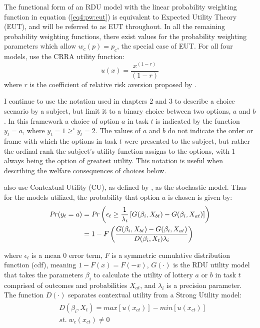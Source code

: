 \documentclass[../main.tex]{subfiles}
\begin{document}
The functional form of an RDU model with the linear probability weighting function in equation (\ref{eq4:pw:eut}) is equivalent to Expected Utility Theory (EUT), and will be referred to as EUT throughout.
In all the remaining probability weighting functions, there exist values for the probability weighting parameters which allow $w_c(p) = p_c$, the special case of EUT.
For all four models, \textcite{Harrison2016} use the CRRA utility function:
\begin{equation}
	\label{eq4:CRRA}
	u(x) = \frac{x^{(1-r)}}{(1-r)}
\end{equation}
\noindent where $r$ is the coefficient of relative risk aversion proposed by \textcite{Pratt1964}.

I continue to use the notation used in chapters 2 and 3 to describe a choice scenario by a subject, but limit it to a binary choice between two options, $a$ and $b$.
In this framework a choice of option $a$ in task $t$ is indicated by the function $y_t = a$, where $y_t = 1 \geq^i y_t = 2$.
The values of $a$ and $b$ do not indicate the order or frame with which the options in task $t$ were presented to the subject, but rather the ordinal rank the subject's utility function assigns to the options, with 1 always being the option of greatest utility.
This notation is useful when describing the welfare consequences of choices below.

\textcite{Harrison2016} also use Contextual Utility (CU), as defined by \textcite{Wilcox2008}, as the stochastic model.
Thus for the models utilized, the probability that option $a$ is chosen is given by:
\begin{align}
	\label{eq4:RE.2}
	\begin{split}
		{\ensuremath{\mathit{Pr}}}(y_t = a) &= {\mathit{Pr}}\left(  \epsilon_t \geq \frac{1}{\lambda_i} \left[ G(\beta_i,X_{bt}) - G(\beta_i,X_{at}) \right] \right)\\
		&= 1 - F\left( \dfrac{G(\beta_i,X_{bt}) - G(\beta_i,X_{at})}{D(\beta_i,X_t)\lambda_i }  \right)
	\end{split}
\end{align}

\noindent where $\epsilon_t$ is a mean 0 error term, $F$ is a symmetric cumulative distribution function (cdf), meaning $1 - F(x)  = F(-x)$, $G(\cdot)$ is the RDU utility model that takes the parameters $\beta_i$ to calculate the utility of lottery $a$ or $b$ in task $t$ comprised of outcomes and probabilities $X_{at}$, and $\lambda_i$ is a precision parameter.
The function $D(\cdot)$ separates contextual utility from a Strong Utility model:
\begin{align}
	\label{eq4:W.cu}
	\begin{split}
		&D(\beta_i,X_t) = \mathit{max}[u(x_{ct})] - \mathit{min}[u(x_{ct})]\\
		&\mathit{st.}\; w_c(x_{ct}) \neq 0
	\end{split}
\end{align}
\end{document}
